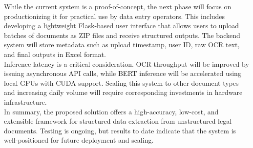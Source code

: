 \documentclass{article}
\begin{document}
While the current system is a proof-of-concept, the next phase will focus on productionizing it for practical use by data entry operators. This includes developing a lightweight Flask-based user interface that allows users to upload batches of documents as ZIP files and receive structured outputs. The backend system will store metadata such as upload timestamp, user ID, raw OCR text, and final outputs in Excel format. \\

Inference latency is a critical consideration. OCR throughput will be improved by issuing asynchronous API calls, while BERT inference will be accelerated using local GPUs with CUDA support. Scaling this system to other document types and increasing daily volume will require corresponding investments in hardware infrastructure. \\

In summary, the proposed solution offers a high-accuracy, low-cost, and extensible framework for structured data extraction from unstructured legal documents. Testing is ongoing, but results to date indicate that the system is well-positioned for future deployment and scaling.



 

\end{document}
